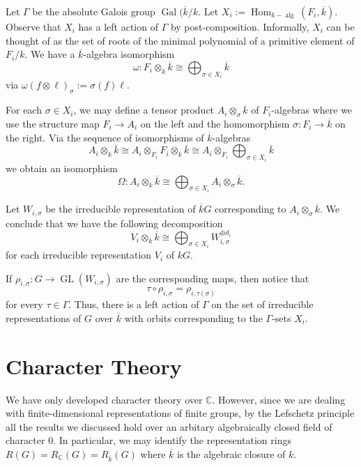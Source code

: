 \documentclass[12pt]{article}
\theoremstyle{plain}
\theoremstyle{definition}
\theoremstyle{remark}
\numberwithin{equation}{section}
\begin{document}
Let $\Gamma$ be the absolute Galois group
$\operatorname{Gal}(\overline{k}/k$.
Let $X_i :=
\operatorname{Hom}_{k-\operatorname{alg}}(F_i,\overline{k})$.
Observe that $X_i$ has a left action of $\Gamma$ by
post-composition.
Informally, $X_i$ can be thought of as the set of roots of the minimal
polynomial of a primitive element of $F_i/k$.
We have a $\overline{k}$-algebra isomorphism
\[
\omega : F_i \otimes_k \overline{k} \cong
\bigoplus_{\sigma \in X_i} \overline{k}
\]
via $\omega(f \otimes \ell)_{\sigma} := \sigma(f)\ell$.

For each $\sigma \in X_i$, we may define a tensor product
$A_i \otimes_\sigma \overline{k}$ of $F_i$-algebras
where we use the structure map $F_i \to A_i$ on the left and
the homomorphism $\sigma : F_i \to \overline{k}$ on the right.
Via the sequence of isomorphisms of $\overline{k}$-algebras
\[
A_i \otimes_k \overline{k} \cong 
A_i \otimes_{F_i} F_i \otimes_k \overline{k}
\cong A_i \otimes_{F_i} \bigoplus_{\sigma \in X_i} \overline{k}
\]
we obtain an isomorphism
\[
\Omega : A_i \otimes_k \overline{k} \cong
\bigoplus_{\sigma \in X_i} A_i \otimes_\sigma \overline{k} .
\]

Let $W_{i,\sigma}$ be the irreducible representation
of $\overline{k}G$ corresponding to $A_i \otimes_\sigma \overline{k}$.
We conclude that we have the following decomposition
\[
V_i \otimes_k \overline{k} \cong
\bigoplus_{\sigma \in X_i} W_{i,\sigma}^{\oplus d_i}
\]
for each irreducible representation $V_i$ of $kG$.

If $\rho_{i,\sigma} : G \to \operatorname{GL}(W_{i,\sigma})$ are
the corresponding maps, then notice that
\[
\tau \circ \rho_{i,\sigma} = \rho_{i,\tau(\sigma)}
\]
for every $\tau \in \Gamma$.
Thus, there is a left action of $\Gamma$ on the set of irreducible
representations of $G$ over $\overline{k}$
with orbits corresponding to the $\Gamma$-sets $X_i$.

\section{Character Theory}

We have only developed character theory over $\mathbb{C}$.
However, since we are dealing with finite-dimensional representations of
finite groups, by the Lefschetz principle
all the results we discussed hold over an arbitary algebraically closed
field of character $0$.
In particular, we may identify the representation rings
$R(G)=R_{\mathbb{C}}(G)=R_{\overline{k}}(G)$
where $\overline{k}$ is the algebraic closure of $k$.
\end{document}
